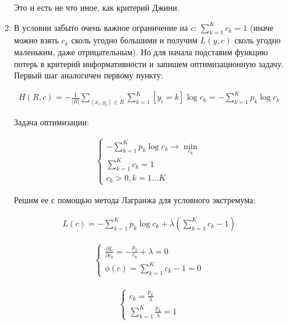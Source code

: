 \documentclass{article}
\begin{document}
\begin{enumerate}
\begin{enumerate}
        Это и есть не что иное, как критерий Джини.

        \item В условии забыто очень важное ограничение на $ c $: $ \sum_{k=1}^{K} c_k = 1 $ (иначе можно взять $ c_k $ сколь угодно
            большими и получим $ L(y, c) $ сколь угодно маленьким, даже отрицательным). Но для начала подставим функцию потерь в критерий
        информативности и запишем оптимизационную задачу. Первый шаг аналогичен первому пункту:

        \small
        \begin{gather*}
            H(R, c) = - \frac{1}{|R|} \sum_{(x_i, y_i) \in R} \sum_{k=1}^K \left[ y_i = k \right] \log{c_k} = - \sum_{k=1}^K p_k \log{c_k}
        \end{gather*}
        \normalsize

        Задача оптимизации:

        \small
        \begin{gather*}
            \begin{cases}
                - \sum_{k=1}^K p_k \log{c_k} \rightarrow \min_{c_k} \\
                \sum_{k=1}^{K} c_k = 1 \\
                c_k > 0, k = 1 ... K
            \end{cases}
        \end{gather*}
        \normalsize
        
        Решим ее с помощью метода Лагранжа для условного экстремума:
        
        \small
        \begin{align*}
            L(c) = - \sum_{k=1}^K p_k \log{c_k} + \lambda \left( \sum_{k=1}^{K} c_k - 1 \right)
        \end{align*}
        
        \begin{align*}
            \begin{cases}
                \frac{\partial L}{\partial c_k} = -\frac{p_k}{c_k} + \lambda = 0 \\
                \phi(c) = \sum_{k=1}^{K} c_k - 1 = 0
            \end{cases}
        \end{align*}

        \begin{align*}
            \begin{cases}
                c_k = \frac{p_k}{\lambda} \\
                \sum_{k=1}^{K} \frac{p_k}{\lambda} = 1
            \end{cases}
        \end{align*}
        

\end{enumerate}
\end{enumerate}
\end{document}
